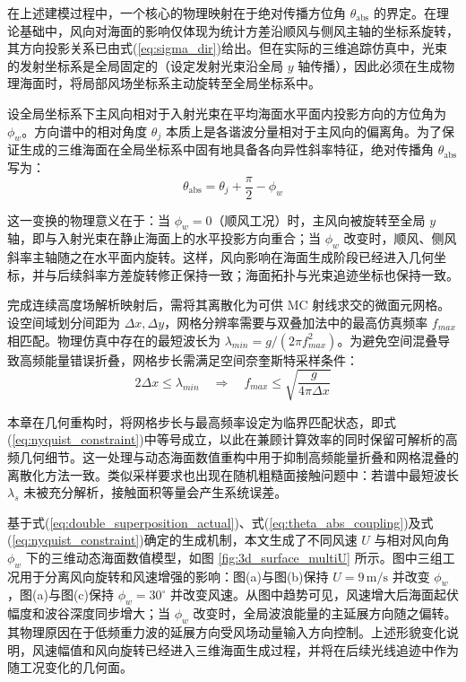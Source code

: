 在上述建模过程中，一个核心的物理映射在于绝对传播方位角 $\theta_{\mathrm{abs}}$ 的界定。在理论基础中，风向对海面的影响仅体现为统计方差沿顺风与侧风主轴的坐标系旋转，其方向投影关系已由式(\ref{eq:sigma_dir})给出。但在实际的三维追踪仿真中，光束的发射坐标系是全局固定的（设定发射光束沿全局 $y$ 轴传播），因此必须在生成物理海面时，将局部风场坐标系主动旋转至全局坐标系中。

设全局坐标系下主风向相对于入射光束在平均海面水平面内投影方向的方位角为 $\phi_w$。方向谱中的相对角度 $\theta_j$ 本质上是各谐波分量相对于主风向的偏离角。为了保证生成的三维海面在全局坐标系中固有地具备各向异性斜率特征，绝对传播角 $\theta_{\mathrm{abs}}$ 写为：
\begin{equation}
\theta_{\mathrm{abs}} = \theta_j + \frac{\pi}{2} - \phi_w
	\label{eq:theta_abs_coupling}
\end{equation}

这一变换的物理意义在于：当 $\phi_w = 0$（顺风工况）时，主风向被旋转至全局 $y$ 轴，即与入射光束在静止海面上的水平投影方向重合；当 $\phi_w$ 改变时，顺风、侧风斜率主轴随之在水平面内旋转。这样，风向影响在海面生成阶段已经进入几何坐标，并与后续斜率方差旋转修正保持一致；海面拓扑与光束追迹坐标也保持一致。

完成连续高度场解析映射后，需将其离散化为可供 MC 射线求交的微面元网格。设空间域划分间距为 $\Delta x, \Delta y$，网格分辨率需要与双叠加法中的最高仿真频率 $f_{max}$ 相匹配。物理仿真中存在的最短波长为 $\lambda_{min} = g / (2\pi f_{max}^2)$。为避免空间混叠导致高频能量错误折叠，网格步长需满足空间奈奎斯特采样条件：
\begin{equation}
	2\Delta x \le \lambda_{min} \quad \Longrightarrow \quad f_{max} \le \sqrt{\frac{g}{4\pi \Delta x}}
	\label{eq:nyquist_constraint}
\end{equation}

本章在几何重构时，将网格步长与最高频率设定为临界匹配状态，即式(\ref{eq:nyquist_constraint})中等号成立，以此在兼顾计算效率的同时保留可解析的高频几何细节。这一处理与动态海面数值重构中用于抑制高频能量折叠和网格混叠的离散化方法一致。类似采样要求也出现在随机粗糙面接触问题中：若谱中最短波长 $\lambda_s$ 未被充分解析，接触面积等量会产生系统误差。

基于式(\ref{eq:double_superposition_actual})、式(\ref{eq:theta_abs_coupling})及式(\ref{eq:nyquist_constraint})确定的生成机制，本文生成了不同风速 $U$ 与相对风向角 $\phi_w$ 下的三维动态海面数值模型，如图 \ref{fig:3d_surface_multiU} 所示。图中三组工况用于分离风向旋转和风速增强的影响：图(a)与图(b)保持 $U=9\,\mathrm{m/s}$ 并改变 $\phi_w$，图(a)与图(c)保持 $\phi_w=30^\circ$ 并改变风速。从图中趋势可见，风速增大后海面起伏幅度和波谷深度同步增大；当 $\phi_w$ 改变时，全局波浪能量的主延展方向随之偏转。其物理原因在于低频重力波的延展方向受风场动量输入方向控制。上述形貌变化说明，风速幅值和风向旋转已经进入三维海面生成过程，并将在后续光线追迹中作为随工况变化的几何面。

